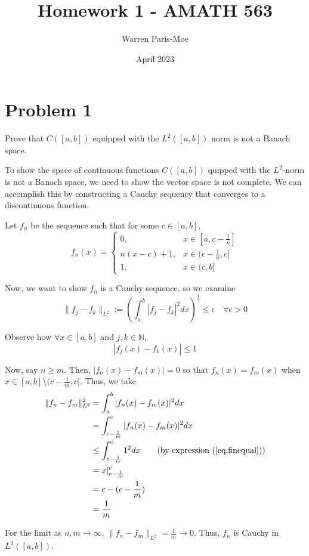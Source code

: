 \documentclass[12pt]{article}
\title{Homework 1 - AMATH 563}
\author{Warren Paris-Moe}
\date{April 2023}
\begin{document}
\section{Problem 1}
\begin{mdframed}
    Prove that $C([a,b])$ equipped with the $L^2([a,b])$ norm is not a Banach space.
\end{mdframed}

To show the space of continuous functions $C([a,b])$ quipped with the $L^2$-norm is not a Banach space, we need to show the vector space is not complete. We can accomplish this by constructing a Cauchy sequency that converges to a discontinuous function.

Let $f_n$ be the sequence such that for some $c\in[a,b]$,
\[
    f_n(x) = 
        \begin{cases}
            0, & x \in [a, c - \frac{1}{n}] \\
            n(x - c) + 1, & x \in (c - \frac{1}{n}, c] \\
            1, & x \in (c, b]
        \end{cases}
\]

Now, we want to show $f_n$ is a Cauchy sequence, so we examine
\[
    \|f_j - f_k\|_{L^2} := (\int_{a}^{b} |f_j-f_k|^2dx)^{\frac{1}{2}} \leq \epsilon \quad \forall \epsilon > 0
\]

Observe how $\forall x \in [a,b]$ and $j,k \in \mathbb{N}$,
\begin{equation} 
\label{eq:finequal}
    |f_j(x) - f_k(x)| \leq 1
\end{equation}

Now, say $n\geq m$. Then, $|f_n(x) - f_m(x)| = 0$ so that $f_n(x) = f_m(x)$ when $x \in [a,b] \setminus (c-\frac{1}{m}, c]$. Thus, we take
\begin{align*}
    \|f_n - f_m\|_{L^2}^2 &= \int_{a}^{b} |f_n(x) - f_m(x)|^2dx \\
        &= \int_{c-\frac{1}{m}}^{c} |f_n(x) - f_m(x)|^2dx \\
        &\leq \int_{c-\frac{1}{m}}^{c} 1^2dx \tag{by expression (\ref{eq:finequal})}\\
        &= x|_{c-\frac{1}{m}}^{c} \\
        &= c - (c - \frac{1}{m}) \\
        &= \frac{1}{m}
\end{align*} 

For the limit as $n,m \to \infty$, $\|f_n-f_m\|_{L^2}=\frac{1}{m} \to 0$. Thus, $f_n$ is Cauchy in $L^2([a,b])$.
\end{document}
